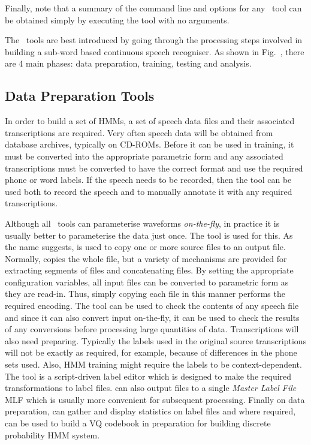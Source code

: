 Finally, note that a summary of the command line and
options for any \HTK\ tool can be obtained simply by executing
the tool with no arguments.


The \HTK\ tools are best introduced by going through the
processing steps involved in building a sub-word based continuous speech 
recogniser.  As shown in Fig.~\href{f:sysoview}, there are 4
main phases: data preparation, training, testing and analysis.

\subsection{Data Preparation Tools}

In order to build a set of HMMs, a set of speech data files
and their associated transcriptions are required.  Very often
speech data will be obtained from database archives, typically
on CD-ROMs.  Before it can be used in training, it must be 
converted into the appropriate parametric form and any associated
transcriptions must be converted to have the correct format
and use the required phone or word labels.  If the speech needs to be
recorded, then the tool  can be used both to record the
speech and to manually annotate it with any required transcriptions.

Although all \HTK\ tools can parameterise waveforms \textit{on-the-fly}, in practice
it is usually better to
parameterise the data just once.  The tool 
is used for this.  As the name suggests,  is used to copy one
or more source files to an output file.  
Normally,  copies the whole file, but a variety
of mechanisms are provided for extracting segments of files and concatenating
files.  By setting the appropriate configuration variables, all input files
can be converted to parametric form as they are read-in.
Thus, simply copying each file in this manner performs the required encoding.
The tool  can be used to check the contents of any speech file
and since it can also convert input on-the-fly, it can be used to check
the results of any conversions before processing large quantities of data.
Transcriptions will also need preparing.  Typically the labels used in the
original source transcriptions will not be exactly as required, for example,
because of differences in the phone sets used.  Also, HMM training might
require the labels to be context-dependent.  The tool  is
a script-driven label editor which is designed to make the required transformations
to label files.   can also output files  to a single \textit{Master Label
File} MLF which is usually more convenient for subsequent processing.
Finally on data preparation,  can gather and display statistics
on label files and where required,  can be used to build a
VQ codebook in preparation for building  discrete probability HMM system.

